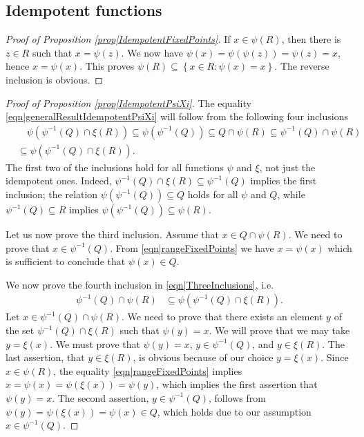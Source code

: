 \documentclass[reqno]{amsart}
\begin{document}
 \begin{appendix}

\section{Idempotent functions} 
 \begin{proof}[Proof of Proposition \ref{prop|IdempotentFixedPoints}]
 If $x\in \psi(R)$, then there is $z\in R$ such that $x=\psi(z)$. We now have $\psi(x)=\psi(\psi(z))=\psi(z)=x$, hence $x=\psi(x)$. This proves $\psi(R)\subseteq \left\{x\in R: \psi(x)=x\right\}$. The reverse inclusion is obvious. 
 \end{proof}
 
 \begin{proof}[Proof of Proposition \ref{prop|IdempotentPsiXi}]
 The equality \eqref{eqn|generalResultIdempotentPsiXi} will follow from the following four inclusions 
\begin{align}
&\quad\psi\left(\psi^{-1}(Q)\cap \xi(R)\right)\subseteq
\psi(\psi^{-1}(Q))\subseteq Q\cap \psi(R)\subseteq \psi^{-1}(Q)\cap \psi(R)\nonumber \\
&\subseteq \psi\left(\psi^{-1}(Q)\cap \xi(R)\right). 
\label{eqn|ThreeInclusions}
\end{align}
The first two of the inclusions hold for all functions $\psi$ and $\xi$, not just the idempotent ones.
Indeed, $\psi^{-1}(Q)\cap\xi(R)\subseteq \psi^{-1}(Q)$ implies the first inclusion; the relation $\psi(\psi^{-1}(Q))\subseteq Q$ holds for all $\psi$ and $Q$, while $\psi^{-1}(Q)\subseteq R$ implies $\psi(\psi^{-1}(Q))\subseteq \psi(R)$.  

Let us now prove the third inclusion. Assume that $x\in Q\cap \psi(R)$. We need to prove that $x\in \psi^{-1}(Q)$. From \eqref{eqn|rangeFixedPoints} we have $x=\psi(x)$ which is sufficient to conclude that 
$\psi(x)\in Q$. 

We now prove the fourth inclusion in \eqref{eqn|ThreeInclusions}, i.e.
\begin{align*}
 \psi^{-1}(Q)\cap \psi(R)&\subseteq  \psi\left(\psi^{-1}(Q)\cap \xi(R)\right).  
\end{align*}
Let $x\in \psi^{-1}(Q)\cap \psi(R)$. We need to prove that there exists an element $y$ of the set $\psi^{-1}(Q)\cap \xi(R)$ such that $\psi(y)=x$. We will prove that we may take $y=\xi(x)$. We must prove that $\psi(y)=x$, 
$y\in \psi^{-1}(Q)$, and $y\in \xi(R)$. 
The last assertion, that $y\in \xi(R)$, is obvious because of our choice $y=\xi(x)$. Since $x\in \psi(R)$, the equality \eqref{eqn|rangeFixedPoints} implies $x=\psi(x)=\psi(\xi(x))=\psi(y)$, which implies the first assertion that $\psi(y)=x$. The second assertion, $y\in \psi^{-1}(Q)$, follows from $\psi(y)=\psi(\xi(x))= \psi(x)\in Q$, which holds due to our assumption $x\in \psi^{-1}(Q)$. 
\end{proof}


\end{appendix}
\end{document}
